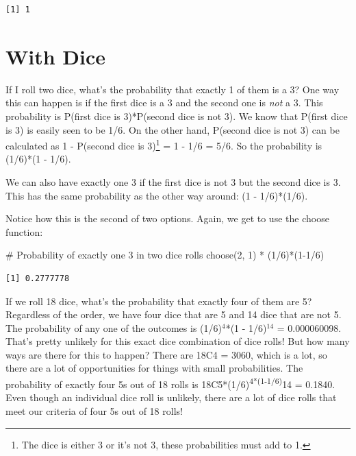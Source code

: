 \documentclass[
  letterpaper,
  DIV=11,
  numbers=noendperiod]{scrreprt}
\newenvironment{Shaded}{\begin{snugshade}}{\end{snugshade}}
\newcommand{\CommentTok}[1]{\textcolor[rgb]{0.37,0.37,0.37}{#1}}
\newcommand{\DecValTok}[1]{\textcolor[rgb]{0.68,0.00,0.00}{#1}}
\newcommand{\FunctionTok}[1]{\textcolor[rgb]{0.28,0.35,0.67}{#1}}
\newcommand{\NormalTok}[1]{\textcolor[rgb]{0.00,0.23,0.31}{#1}}
\newcommand{\SpecialCharTok}[1]{\textcolor[rgb]{0.37,0.37,0.37}{#1}}
\begin{document}
\begin{verbatim}
[1] 1
\end{verbatim}

\hypertarget{with-dice}{%
\section{With Dice}\label{with-dice}}

If I roll two dice, what's the probability that exactly 1 of them is a
3? One way this can happen is if the first dice is a 3 and the second
one is \emph{not} a 3. This probability is P(first dice is 3)*P(second
dice is not 3). We know that P(first dice is 3) is easily seen to be
1/6. On the other hand, P(second dice is not 3) can be calculated as 1 -
P(second dice is 3)\footnote{The dice is either 3 or it's not 3, these
  probabilities must add to 1.} = 1 - 1/6 = 5/6. So the probability is
(1/6)*(1 - 1/6).

We can also have exactly one 3 if the first dice is not 3 but the second
dice is 3. This has the same probability as the other way around: (1 -
1/6)*(1/6).

Notice how this is the second of two options. Again, we get to use the
choose function:

\begin{Shaded}
\begin{Highlighting}[]
\CommentTok{\# Probability of exactly one 3 in two dice rolls}
\FunctionTok{choose}\NormalTok{(}\DecValTok{2}\NormalTok{, }\DecValTok{1}\NormalTok{) }\SpecialCharTok{*}\NormalTok{ (}\DecValTok{1}\SpecialCharTok{/}\DecValTok{6}\NormalTok{)}\SpecialCharTok{*}\NormalTok{(}\DecValTok{1{-}1}\SpecialCharTok{/}\DecValTok{6}\NormalTok{)}
\end{Highlighting}
\end{Shaded}

\begin{verbatim}
[1] 0.2777778
\end{verbatim}

If we roll 18 dice, what's the probability that exactly four of them are
5? Regardless of the order, we have four dice that are 5 and 14 dice
that are not 5. The probability of any one of the outcomes is
(1/6)\(^4\)*(1 - 1/6)\(^{14}\) = 0.000060098. That's pretty unlikely for
this exact dice combination of dice rolls! But how many ways are there
for this to happen? There are 18C4 = 3060, which is a lot, so there are
a lot of opportunities for things with small probabilities. The
probability of exactly four 5s out of 18 rolls is
18C5*(1/6)\textsuperscript{4*(1-1/6)}14 = 0.1840. Even though an
individual dice roll is unlikely, there are a lot of dice rolls that
meet our criteria of four 5s out of 18 rolls!
\end{document}
